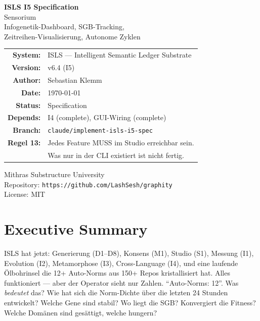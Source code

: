 \documentclass[11pt,a4paper]{article}
\begin{document}
\begin{titlepage}
\centering
\vspace*{2.5cm}

{\Huge\bfseries\color{isls-blue} ISLS I5 Specification}\\[0.5cm]
{\LARGE\color{isls-orange} Sensorium}\\[0.3cm]
{\large\color{isls-gray} Infogenetik-Dashboard, SGB-Tracking,\\
Zeitreihen-Visualisierung, Autonome Zyklen}\\[2cm]

{\large
\begin{tabular}{rl}
\textbf{System:}       & ISLS --- Intelligent Semantic Ledger Substrate \\
\textbf{Version:}      & v6.4 (I5) \\
\textbf{Author:}       & Sebastian Klemm \\
\textbf{Date:}         & \today \\
\textbf{Status:}       & Specification \\
\textbf{Depends:}      & I4 (complete), GUI-Wiring (complete) \\
\textbf{Branch:}       & \texttt{claude/implement-isls-i5-spec} \\
\textbf{Regel 13:}     & Jedes Feature MUSS im Studio erreichbar sein. \\
                        & Was nur in der CLI existiert ist nicht fertig. \\
\end{tabular}
}

\vfill

{\small\color{isls-gray}
Mithras Substructure University\\
Repository: \texttt{https://github.com/LashSesh/graphity}\\
License: MIT
}
\end{titlepage}

\tableofcontents
\newpage


\section{Executive Summary}

ISLS hat jetzt: Generierung (D1--D8), Konsens (M1), Studio (S1), 
Messung (I1), Evolution (I2), Metamorphose (I3), Cross-Language (I4), 
und eine laufende \"Olbohrinsel die 12+ Auto-Norms aus 150+ Repos 
kristallisiert hat. Alles funktioniert --- aber der Operator 
sieht nur Zahlen. ``Auto-Norms: 12''. Was \emph{bedeutet} das? 
Wie hat sich die Norm-Dichte \"uber die letzten 24 Stunden 
entwickelt? Welche Gene sind stabil? Wo liegt die SGB? Konvergiert 
die Fitness? Welche Dom\"anen sind ges\"attigt, welche hungern?
\end{document}
